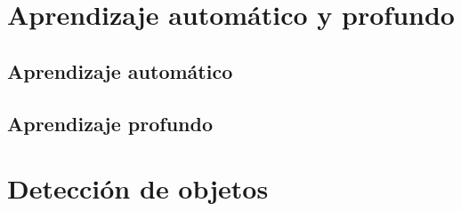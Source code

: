 \section{Aprendizaje automático y profundo}
\subsection{Aprendizaje automático}
\subsection{Aprendizaje profundo}
\section{Detección de objetos}
